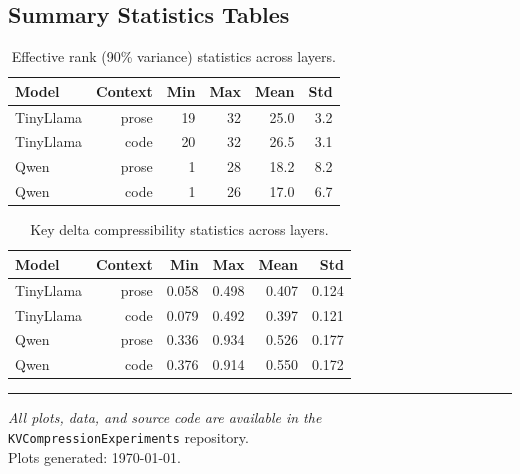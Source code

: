 \documentclass[11pt,a4paper]{article}
\begin{document}
\subsection{Summary Statistics Tables}

\begin{table}[H]
\centering
\caption{Effective rank (90\% variance) statistics across layers.}
\label{tab:effrank}
\begin{tabular}{lrrrrr}
\toprule
\textbf{Model} & \textbf{Context} & \textbf{Min} & \textbf{Max}
& \textbf{Mean} & \textbf{Std} \\
\midrule
TinyLlama & prose & 19 & 32 & 25.0 & 3.2 \\
TinyLlama & code  & 20 & 32 & 26.5 & 3.1 \\
Qwen      & prose & 1  & 28 & 18.2 & 8.2 \\
Qwen      & code  & 1  & 26 & 17.0 & 6.7 \\
\bottomrule
\end{tabular}
\end{table}

\begin{table}[H]
\centering
\caption{Key delta compressibility statistics across layers.}
\label{tab:delta}
\begin{tabular}{lrrrrr}
\toprule
\textbf{Model} & \textbf{Context} & \textbf{Min} & \textbf{Max}
& \textbf{Mean} & \textbf{Std} \\
\midrule
TinyLlama & prose & 0.058 & 0.498 & 0.407 & 0.124 \\
TinyLlama & code  & 0.079 & 0.492 & 0.397 & 0.121 \\
Qwen      & prose & 0.336 & 0.934 & 0.526 & 0.177 \\
Qwen      & code  & 0.376 & 0.914 & 0.550 & 0.172 \\
\bottomrule
\end{tabular}
\end{table}

\vspace{1cm}
\noindent\rule{\textwidth}{0.4pt}
\vspace{0.5cm}

\begin{center}
\textit{All plots, data, and source code are available in the}\\[2pt]
\texttt{KVCompressionExperiments} repository.\\
Plots generated: \today.
\end{center}
\end{document}
